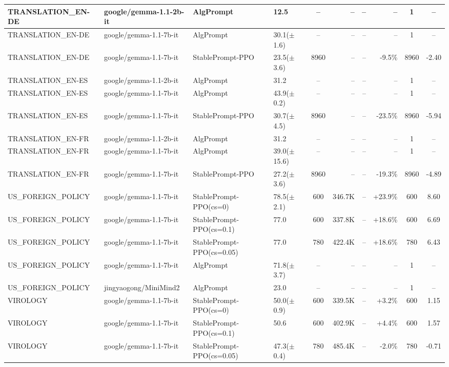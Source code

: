 {\begin{longtable}{@{}p{5.5cm}p{4.5cm}p{2.5cm}lcrrrcc@{}}
\midrule
TRANSLATION\_EN-DE & google/gemma-1.1-2b-it & AlgPrompt & 12.5 & -- & -- & -- & -- & 1 & -- \\
\midrule
TRANSLATION\_EN-DE & google/gemma-1.1-7b-it & AlgPrompt & 30.1($\pm$1.6) & -- & -- & -- & -- & 1 & -- \\
TRANSLATION\_EN-DE & google/gemma-1.1-7b-it & StablePrompt-PPO & 23.5($\pm$3.6) & 8960 & -- & -- & -9.5\% & 8960 & -2.40 \\
\midrule
TRANSLATION\_EN-ES & google/gemma-1.1-2b-it & AlgPrompt & 31.2 & -- & -- & -- & -- & 1 & -- \\
\midrule
TRANSLATION\_EN-ES & google/gemma-1.1-7b-it & AlgPrompt & 43.9($\pm$0.2) & -- & -- & -- & -- & 1 & -- \\
TRANSLATION\_EN-ES & google/gemma-1.1-7b-it & StablePrompt-PPO & 30.7($\pm$4.5) & 8960 & -- & -- & -23.5\% & 8960 & -5.94 \\
\midrule
TRANSLATION\_EN-FR & google/gemma-1.1-2b-it & AlgPrompt & 31.2 & -- & -- & -- & -- & 1 & -- \\
\midrule
TRANSLATION\_EN-FR & google/gemma-1.1-7b-it & AlgPrompt & 39.0($\pm$15.6) & -- & -- & -- & -- & 1 & -- \\
TRANSLATION\_EN-FR & google/gemma-1.1-7b-it & StablePrompt-PPO & 27.2($\pm$3.6) & 8960 & -- & -- & -19.3\% & 8960 & -4.89 \\
\midrule
US\_FOREIGN\_POLICY & google/gemma-1.1-7b-it & StablePrompt-PPO(cs=0) & 78.5($\pm$2.1) & 600 & 346.7K & -- & +23.9\% & 600 & 8.60 \\
US\_FOREIGN\_POLICY & google/gemma-1.1-7b-it & StablePrompt-PPO(cs=0.1) & 77.0 & 600 & 337.8K & -- & +18.6\% & 600 & 6.69 \\
US\_FOREIGN\_POLICY & google/gemma-1.1-7b-it & StablePrompt-PPO(cs=0.05) & 77.0 & 780 & 422.4K & -- & +18.6\% & 780 & 6.43 \\
US\_FOREIGN\_POLICY & google/gemma-1.1-7b-it & AlgPrompt & 71.8($\pm$3.7) & -- & -- & -- & -- & 1 & -- \\
\midrule
US\_FOREIGN\_POLICY & jingyaogong/MiniMind2 & AlgPrompt & 23.0 & -- & -- & -- & -- & 1 & -- \\
\midrule
VIROLOGY & google/gemma-1.1-7b-it & StablePrompt-PPO(cs=0) & 50.0($\pm$0.9) & 600 & 339.5K & -- & +3.2\% & 600 & 1.15 \\
VIROLOGY & google/gemma-1.1-7b-it & StablePrompt-PPO(cs=0.1) & 50.6 & 600 & 402.9K & -- & +4.4\% & 600 & 1.57 \\
VIROLOGY & google/gemma-1.1-7b-it & StablePrompt-PPO(cs=0.05) & 47.3($\pm$0.4) & 780 & 485.4K & -- & -2.0\% & 780 & -0.71 \\

\end{longtable}}
